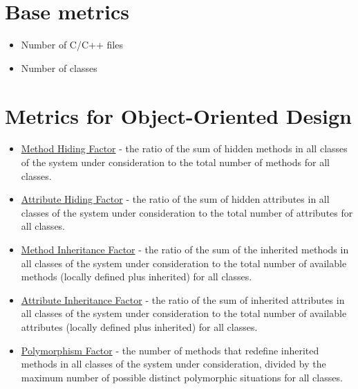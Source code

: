\documentclass{article}
\begin{document}
\section{Base metrics}
\begin{itemize}
\item Number of C/C++ files
\item Number of classes
\end{itemize}

\section{Metrics for Object-Oriented Design}

\begin{itemize}

\item \href{https://www.researchgate.net/publication/2253619_Object-Oriented_Software_Engineering_Measuring_and_Controlling_the_Development_Process}{Method Hiding Factor} - the ratio of the sum of hidden methods in all classes of the system under consideration to the total number of methods for all classes.

\item \href{https://www.researchgate.net/publication/2253619_Object-Oriented_Software_Engineering_Measuring_and_Controlling_the_Development_Process}{Attribute Hiding Factor} - the ratio of the sum of hidden attributes in all classes of the system under consideration to the total number of attributes for all classes.

\item \href{https://www.researchgate.net/publication/2253619_Object-Oriented_Software_Engineering_Measuring_and_Controlling_the_Development_Process}{Method Inheritance Factor} - the ratio of the sum of the inherited methods in all classes of the system under consideration to the total number of available methods (locally defined plus inherited) for all classes.

\item \href{https://www.researchgate.net/publication/2253619_Object-Oriented_Software_Engineering_Measuring_and_Controlling_the_Development_Process}{Attribute Inheritance Factor} - the ratio of the sum of inherited attributes in all classes of the system under consideration to the total number of available attributes (locally defined plus inherited) for all classes.

\item \href{https://www.researchgate.net/publication/2253619_Object-Oriented_Software_Engineering_Measuring_and_Controlling_the_Development_Process}{Polymorphism Factor} - the number of methods that redefine inherited methods in all classes of the system under consideration, divided by the
maximum number of possible distinct polymorphic situations for all classes.


\end{itemize}
\end{document}
